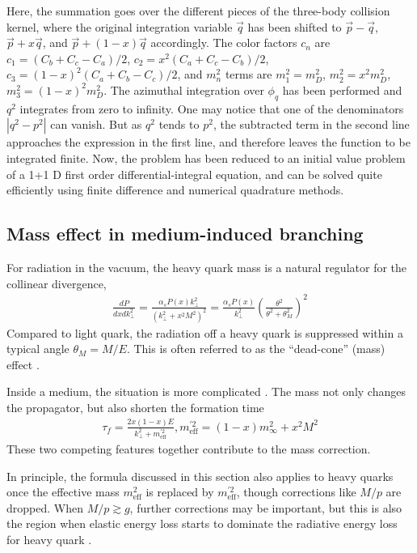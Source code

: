 Here, the summation goes over the different pieces of the three-body collision kernel, where the original integration variable $\vec{q}$ has been shifted to $\vec{p}-\vec{q}$, $\vec{p}+x\vec{q}$, and $\vec{p}+(1-x) \vec{q}$ accordingly.
The color factors $c_n$ are $c_1 = (C_b+C_c-C_a)/2$, $c_2 = x^2(C_a+C_c-C_b)/2$, $c_3 = (1-x)^2(C_a+C_b-C_c)/2$, and $m_n^2$ terms are $m_1^2 = m_D^2$, $m_2^2 = x^2 m_D^2$, $m_3^2 = (1-x)^2 m_D^2$.
The azimuthal integration over $\phi_q$ has been performed and $q^2$  integrates from zero to infinity.
One may notice that one of the denominators $|q^2-p^2|$ can vanish.
But as $q^2$ tends to $p^2$, the subtracted term in the second line approaches the expression in the first line, and therefore leaves the function to be integrated finite.
Now, the problem has been reduced to an initial value problem of a 1+1 D first order differential-integral equation, and can be solved quite efficiently using finite difference and numerical quadrature methods.

\subsection{Mass effect in medium-induced branching}
For radiation in the vacuum, the heavy quark mass is a natural regulator for the collinear divergence,
\begin{eqnarray}
\frac{dP}{dx dk_\perp^2} = \frac{\alpha_s P(x) k_\perp^2}{(k_\perp^2 + x^2 M^2)^2} = \frac{\alpha_s P(x)}{k_\perp^2}\left(\frac{\theta^2}{\theta^2 + \theta_M^2}\right)^2
\end{eqnarray}
Compared to light quark, the radiation off a heavy quark is suppressed within a typical angle $\theta_M = M/E$.
This is often referred to as the ``dead-cone'' (mass) effect \cite{Dokshitzer_1991}.

Inside a medium, the situation is more complicated \cite{Dokshitzer:2001zm,Armesto:2003jh,Abir:2012pu,Zhang:2003wk}. 
The mass not only changes the propagator, but also shorten the formation time
\begin{eqnarray}
\tau_f = \frac{2x(1-x)E}{k_\perp^2 + m_{\textrm{eff}}^{'2}}, m_{\textrm{eff}}^{'2} = (1-x)m_\infty^2 + x^2 M^2
\end{eqnarray}
These two competing features together contribute to the mass correction.

In principle, the formula discussed in this section also applies to heavy quarks once the effective mass $m_{\textrm{eff}}^2$ is replaced by $m_{\textrm{eff}}^{'2}$, though corrections like $M/p$ are dropped.
When $M/p \gtrsim g$, further corrections may be important, but this is also the region when elastic energy loss starts to dominate the radiative energy loss for heavy quark \cite{Moore:2004tg}.

